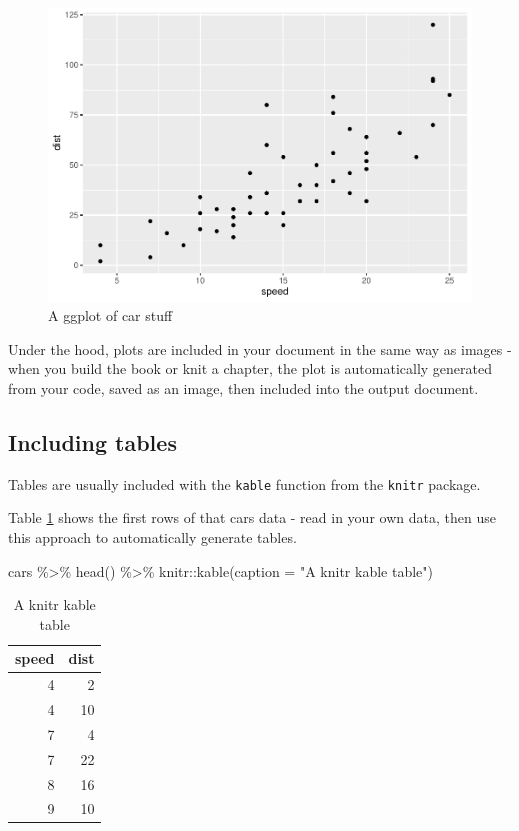 \documentclass[a4paper, nobind]{templates/ociamthesis}
\newenvironment{Shaded}{\begin{snugshade}}{\end{snugshade}}
\newcommand{\AttributeTok}[1]{\textcolor[rgb]{0.77,0.63,0.00}{#1}}
\newcommand{\FunctionTok}[1]{\textcolor[rgb]{0.00,0.00,0.00}{#1}}
\newcommand{\NormalTok}[1]{#1}
\newcommand{\SpecialCharTok}[1]{\textcolor[rgb]{0.00,0.00,0.00}{#1}}
\newcommand{\StringTok}[1]{\textcolor[rgb]{0.31,0.60,0.02}{#1}}
\renewenvironment{Shaded}
{
  \vspace{10pt}%
  \begin{snugshade}%
}{%
  \end{snugshade}%
  \vspace{8pt}%
}
\begin{document}
\begin{figure}
\centering
\includegraphics{_main_files/figure-latex/cars-plot-1.pdf}
\caption{\label{fig:cars-plot}A ggplot of car stuff}
\end{figure}

Under the hood, plots are included in your document in the same way as images - when you build the book or knit a chapter, the plot is automatically generated from your code, saved as an image, then included into the output document.

\hypertarget{including-tables}{%
\subsection{Including tables}\label{including-tables}}

Tables are usually included with the \texttt{kable} function from the \texttt{knitr} package.

Table \ref{tab:cars-table} shows the first rows of that cars data - read in your own data, then use this approach to automatically generate tables.

\begin{Shaded}
\begin{Highlighting}[]
\NormalTok{cars }\SpecialCharTok{\%\textgreater{}\%} 
  \FunctionTok{head}\NormalTok{() }\SpecialCharTok{\%\textgreater{}\%} 
\NormalTok{  knitr}\SpecialCharTok{::}\FunctionTok{kable}\NormalTok{(}\AttributeTok{caption =} \StringTok{"A knitr kable table"}\NormalTok{)}
\end{Highlighting}
\end{Shaded}

\begin{table}

\caption{\label{tab:cars-table}A knitr kable table}
\centering
\begin{tabular}[t]{r|r}
\hline
speed & dist\\
\hline
4 & 2\\
\hline
4 & 10\\
\hline
7 & 4\\
\hline
7 & 22\\
\hline
8 & 16\\
\hline
9 & 10\\
\hline
\end{tabular}
\end{table}
\end{document}
